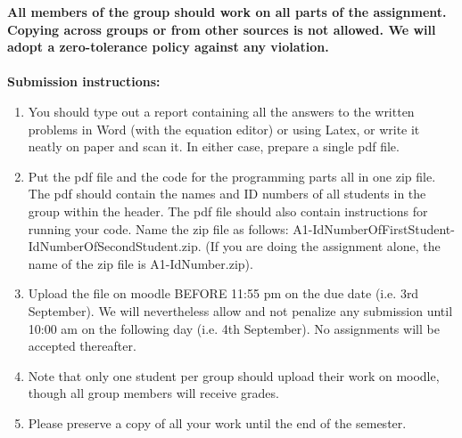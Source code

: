 \documentclass[11pt]{article}
\begin{document}
\maketitle

\textbf{All members of the group should work on all parts of the assignment. Copying across groups or from other sources is not allowed. We will adopt a \textbf{zero-tolerance policy} against any violation.}
\\
\\
\textbf{Submission instructions:} 
\begin{enumerate}
\item You should type out a report containing all the answers to the written problems in Word (with the equation editor) or using Latex, or write it neatly on paper and scan it. In either case, prepare a single pdf file. 
\item Put the pdf file and the code for the programming parts all in one zip file. The pdf should contain the names and ID numbers of all students in the group within the header. The pdf file should also contain instructions for running your code. Name the zip file as follows: A1-IdNumberOfFirstStudent-IdNumberOfSecondStudent.zip. (If you are doing the assignment alone, the name of the zip file is A1-IdNumber.zip). 
\item Upload the file on moodle BEFORE 11:55 pm on the due date (i.e. 3rd September). We will nevertheless allow and not penalize any submission until 10:00 am on the following day (i.e. 4th September). No assignments will be accepted thereafter. 
\item Note that only one student per group should upload their work on moodle, though all group members will receive grades. 
\item Please preserve a copy of all your work until the end of the semester. 
\end{enumerate}
\end{document}
